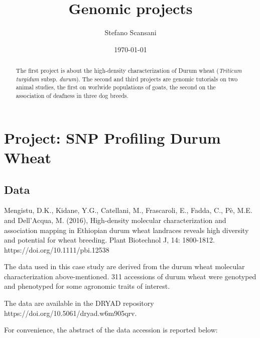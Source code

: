 \documentclass[a4paper,onecolumn,10pt]{article}
\begin{document}
\title{Genomic projects}
\author{Stefano Scansani}
\date{\today}
\maketitle
\begin{abstract}

    The first project is about the high-density characterization of Durum wheat (\textit{Triticum turgidum} subsp. \textit{durum}).
    The second and third projects are genomic tutorials on two animal studies, the first on worlwide populations of goats, the second on the association of deafness in three dog breeds.

\end{abstract}
\tableofcontents
\listoffigures
\listoftables


\section{Project: SNP Profiling Durum Wheat}

\subsection{Data}

Mengistu, D.K., Kidane, Y.G., Catellani, M., Frascaroli, E., Fadda, C., Pè, M.E. and Dell'Acqua, M. (2016), High-density molecular characterization and association mapping in Ethiopian durum wheat landraces reveals high diversity and potential for wheat breeding. Plant Biotechnol J, 14: 1800-1812. https://doi.org/10.1111/pbi.12538

The data used in this case study are derived from the durum wheat molecular characterization above-mentioned.
311 accessions of durum wheat were genotyped and phenotyped for some agronomic traits of interest.

The data are available in the DRYAD repository https://doi.org/10.5061/dryad.w6m905qrv.

For convenience, the abstract of the data accession is reported below:
\end{document}
